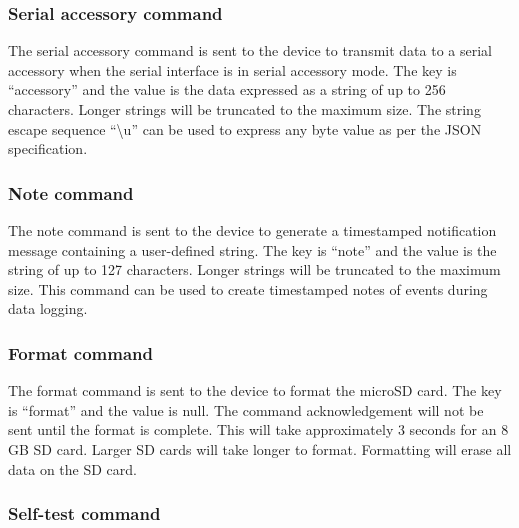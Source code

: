 
\subsubsection{Serial accessory command}

The serial accessory command is sent to the device to transmit data to a serial accessory when the serial interface is in serial accessory mode.  The key is \enquote{accessory} and the value is the data expressed as a string of up to 256 characters.  Longer strings will be truncated to the maximum size.  The string escape sequence \enquote{\textbackslash u} can be used to express any byte value as per the \ac{JSON} specification.


\subsubsection{Note command}

The note command is sent to the device to generate a timestamped notification message containing a user-defined string.  The key is \enquote{note} and the value is the string of up to 127 characters.  Longer strings will be truncated to the maximum size.  This command can be used to create timestamped notes of events during data logging.


\subsubsection{Format command}

The format command is sent to the device to format the \ac{microSD} card.  The key is \enquote{format} and the value is null.  The command acknowledgement will not be sent until the format is complete.  This will take approximately 3 seconds for an 8 GB SD card.  Larger SD cards will take longer to format.  Formatting will erase all data on the SD card.


\subsubsection{Self-test command}

